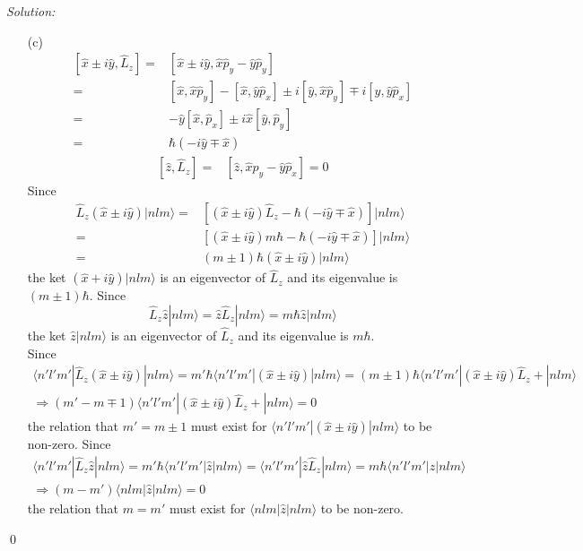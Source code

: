 \documentclass[10pt,a4paper]{article}
\newenvironment{sol}
    {\emph{Solution:}
    }
    {
    \qed
    }
\begin{document}
\begin{sol}
\begin{itemize}
\item[(c)]
\begin{align}
\nonumber[\hat{x}\pm i\hat{y},\hat{L}_z]=&[\hat{x}\pm i\hat{y},\hat{x}\hat{p}_y-\hat{y}\hat{p}_y]\\
\nonumber=&[\hat{x},\hat{x}\hat{p}_y]-[\hat{x},\hat{y}\hat{p}_x]\pm i[\hat{y},\hat{x}\hat{p}_y]\mp i[\hat{y},\hat{y}\hat{p}_x]\\
\nonumber=&-\hat{y}[\hat{x},\hat{p}_x]\pm i\hat{x}[\hat{y},\hat{p}_y]\\
=&\hbar(-i\hat{y}\mp\hat{x})
\end{align}
\begin{align}
\nonumber[\hat{z},\hat{L}_z]=&[\hat{z},\hat{x}\hat{p}_y-\hat{y}\hat{p}_x]=0
\end{align}
Since
\begin{align}
\nonumber\hat{L}_z(\hat{x}\pm i\hat{y})|nlm\rangle=&[(\hat{x}\pm i\hat{y})\hat{L}_z-\hbar(-i\hat{y}\mp\hat{x})]|nlm\rangle\\
\nonumber=&[(\hat{x}\pm i\hat{y})m\hbar-\hbar(-i\hat{y}\mp\hat{x})]|nlm\rangle\\
=&(m\pm1)\hbar(\hat{x}\pm i\hat{y})|nlm\rangle
\end{align}
the ket $(\hat{x}+i\hat{y})|nlm\rangle$ is an eigenvector of $\hat{L}_z$ and its eigenvalue is $(m\pm1)\hbar$.
Since
\begin{equation}
\hat{L}_z\hat{z}|nlm\rangle=\hat{z}\hat{L}_z|nlm\rangle=m\hbar\hat{z}|nlm\rangle
\end{equation}
the ket $\hat{z}|nlm\rangle$ is an eigenvector of $\hat{L}_z$ and its eigenvalue is $m\hbar$.\\
Since
\begin{gather}
\langle n'l'm'|\hat{L}_z(\hat{x}\pm i\hat{y})|nlm\rangle=m'\hbar\langle n'l'm'|(\hat{x}\pm i\hat{y})|nlm\rangle=(m\pm1)\hbar\langle n'l'm'|(\hat{x}\pm i\hat{y})\hat{L}_z+|nlm\rangle\\
\Longrightarrow(m'-m\mp1)\langle n'l'm'|(\hat{x}\pm i\hat{y})\hat{L}_z+|nlm\rangle=0
\end{gather}
the relation that $m'=m\pm1$ must exist for $\langle n'l'm'|(\hat{x}\pm i\hat{y})|nlm\rangle$ to be non-zero.
Since
\begin{gather}
\langle n'l'm'|\hat{L}_z\hat{z}|nlm\rangle=m'\hbar\langle n'l'm'|\hat{z}|nlm\rangle=\langle n'l'm'|\hat{z}\hat{L}_z|nlm\rangle=m\hbar\langle n'l'm'|\hat{z}|nlm\rangle\\
\Longrightarrow(m-m')\langle nlm|\hat{z}|nlm\rangle=0
\end{gather}
the relation that $m=m'$ must exist for $\langle nlm|\hat{z}|nlm\rangle$ to be non-zero.

\end{itemize}
\end{sol}
\end{document}
